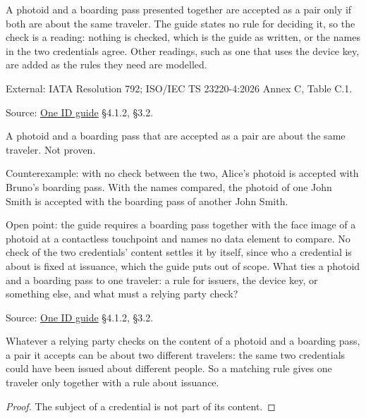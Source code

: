\begin{definition}
  \label{def:traveler-match}
  A photoid and a boarding pass presented together are accepted as a pair
  only if both are about the same traveler.  The guide states no rule for
  deciding it, so the check is a reading: nothing is checked, which is the
  guide as written, or the names in the two credentials agree.  Other
  readings, such as one that uses the device key, are added as the rules they
  need are modelled.

  External: IATA Resolution 792; ISO/IEC TS 23220-4:2026 Annex C, Table C.1.

  Source: \href{https://standards.atlassian.net/wiki/spaces/OneID/pages/2947416082/Technical+Implementation+Guide}{One ID guide} §4.1.2, §3.2.
\end{definition}

\begin{theorem}
  \label{thm:matched-pair-same-traveler}
  A photoid and a boarding pass that are accepted as a pair are about the
  same traveler.  Not proven.

  Counterexample: with no check between the two, Alice's photoid is accepted
  with Bruno's boarding pass.  With the names compared, the photoid of one
  John Smith is accepted with the boarding pass of another John Smith.

  Open point: the guide requires a boarding pass together with the face image
  of a photoid at a contactless touchpoint and names no data element to
  compare.  No check of the two credentials' content settles it by itself,
  since who a credential is about is fixed at issuance, which the guide puts
  out of scope.  What ties a photoid and a boarding pass to one traveler: a
  rule for issuers, the device key, or something else, and what must a
  relying party check?

  Source: \href{https://standards.atlassian.net/wiki/spaces/OneID/pages/2947416082/Technical+Implementation+Guide}{One ID guide} §4.1.2, §3.2.
\end{theorem}

\begin{theorem}
  \label{thm:no-content-check}
  Whatever a relying party checks on the content of a photoid and a boarding
  pass, a pair it accepts can be about two different travelers: the same two
  credentials could have been issued about different people.  So a matching
  rule gives one traveler only together with a rule about issuance.
\end{theorem}
\begin{proof}
  The subject of a credential is not part of its content.
\end{proof}

